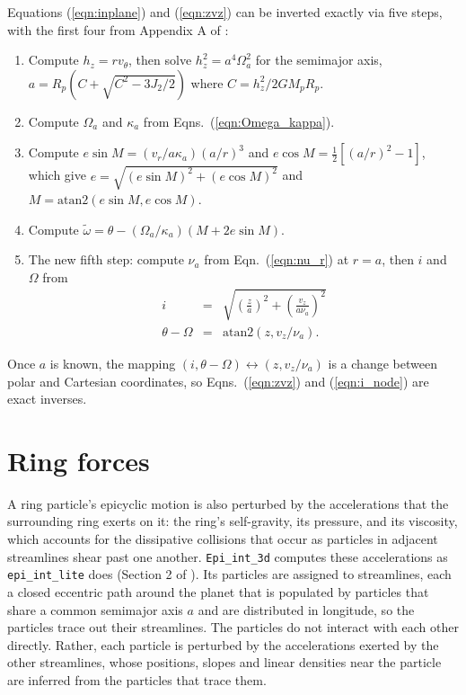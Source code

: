 \documentclass[twocolumn]{aastex702}
\newcommand{\code}[1]{\texttt{#1}}   %
\begin{document}
Equations (\ref{eqn:inplane}) and (\ref{eqn:zvz}) can be inverted exactly via five steps, with the
first four from Appendix A of \cite{H25}:
\begin{enumerate}\raggedright
\item Compute $h_z = rv_\theta$, then solve $h_z^2 = a^4\Omega_a^2$ for the semimajor axis,
    $a = R_p\left(C + \sqrt{C^2 - 3J_2/2}\right)$ where $C = h_z^2/2GM_pR_p$.
\item Compute $\Omega_a$ and $\kappa_a$ from Eqns.\ (\ref{eqn:Omega_kappa}).
\item Compute $e\sin M = (v_r/a\kappa_a)(a/r)^3$ and $e\cos M = \frac{1}{2}[(a/r)^2 - 1]$,
    which give $e = \sqrt{(e\sin M)^2 + (e\cos M)^2}$ and $M = \text{atan2}(e\sin M, e\cos M)$.
\item Compute $\tilde{\omega} = \theta - (\Omega_a/\kappa_a)(M + 2e\sin M)$.
\item The new fifth step: compute $\nu_a$ from Eqn.\ (\ref{eqn:nu_r}) at $r = a$, then $i$ and $\Omega$ from
\begin{subequations}
\label{eqn:i_node}
\begin{eqnarray}
    i &=& \sqrt{\left(\frac{z}{a}\right)^2 + \left(\frac{v_z}{a\nu_a}\right)^2} \label{eqn:i_node_a}\\
    \theta - \Omega &=& \text{atan2}(z, v_z/\nu_a). \label{eqn:i_node_b}
\end{eqnarray}
\end{subequations}
\end{enumerate}
Once $a$ is known, the mapping $(i, \theta - \Omega) \leftrightarrow (z, v_z/\nu_a)$ is a
change between polar and Cartesian coordinates, so Eqns.\ (\ref{eqn:zvz}) and
(\ref{eqn:i_node}) are exact inverses.


\section{Ring forces}
\label{sec:gravity}

A ring particle's epicyclic motion is also perturbed by the accelerations that the surrounding ring
exerts on it: the ring's self-gravity, its pressure, and its viscosity, which accounts for the dissipative
collisions that occur as particles in adjacent streamlines shear past one another. \code{Epi\_int\_3d}
computes these accelerations as \code{epi\_int\_lite} does (Section 2 of \citealt{H25}). Its particles
are assigned to streamlines, each a closed eccentric path around the planet that is populated by
particles that share a common semimajor axis $a$ and are distributed in longitude, so the particles
trace out their streamlines. The particles do not interact with each other directly. Rather, each
particle is perturbed by the accelerations exerted by the other streamlines, whose positions, slopes
and linear densities near the particle are inferred from the particles that trace them.
\end{document}
